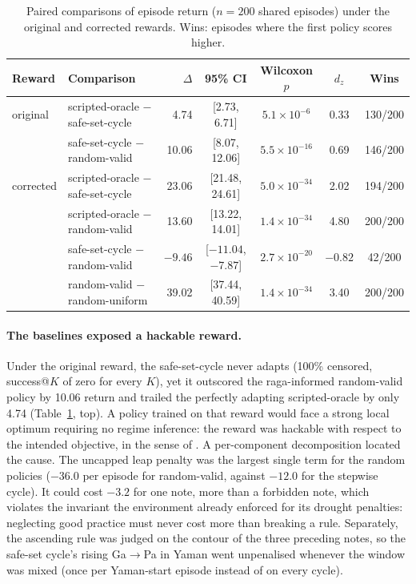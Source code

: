 \documentclass[11pt]{article}
\begin{document}
\begin{table}[t]
\centering\small
\caption{Paired comparisons of episode return ($n=200$ shared episodes) under the original and corrected rewards. Wins: episodes where the first policy scores higher.}
\label{tab:paired}
\begin{tabular}{@{}llrcccc@{}}
\toprule
Reward & Comparison & $\Delta$ & 95\% CI & Wilcoxon $p$ & $d_z$ & Wins \\
\midrule
original  & scripted-oracle $-$ safe-set-cycle & 4.74  & [2.73, 6.71]   & $5.1\times10^{-6}$  & 0.33 & 130/200 \\
          & safe-set-cycle $-$ random-valid    & 10.06 & [8.07, 12.06]  & $5.5\times10^{-16}$ & 0.69 & 146/200 \\
\midrule
corrected & scripted-oracle $-$ safe-set-cycle & 23.06 & [21.48, 24.61] & $5.0\times10^{-34}$ & 2.02 & 194/200 \\
          & scripted-oracle $-$ random-valid   & 13.60 & [13.22, 14.01] & $1.4\times10^{-34}$ & 4.80 & 200/200 \\
          & safe-set-cycle $-$ random-valid    & $-9.46$ & [$-11.04$, $-7.87$] & $2.7\times10^{-20}$ & $-0.82$ & 42/200 \\
          & random-valid $-$ random-uniform    & 39.02 & [37.44, 40.59] & $1.4\times10^{-34}$ & 3.40 & 200/200 \\
\bottomrule
\end{tabular}
\end{table}

\paragraph{The baselines exposed a hackable reward.} Under the original reward, the safe-set-cycle never adapts (100\% censored, success@$K$ of zero for every $K$), yet it outscored the raga-informed random-valid policy by 10.06 return and trailed the perfectly adapting scripted-oracle by only 4.74 (Table~\ref{tab:paired}, top). A policy trained on that reward would face a strong local optimum requiring no regime inference: the reward was hackable with respect to the intended objective, in the sense of \citet{skalse2022rewardhacking}. A per-component decomposition located the cause. The uncapped leap penalty was the largest single term for the random policies ($-36.0$ per episode for random-valid, against $-12.0$ for the stepwise cycle). It could cost $-3.2$ for one note, more than a forbidden note, which violates the invariant the environment already enforced for its drought penalties: neglecting good practice must never cost more than breaking a rule. Separately, the ascending rule was judged on the contour of the three preceding notes, so the safe-set cycle's rising Ga$\to$Pa in Yaman went unpenalised whenever the window was mixed (once per Yaman-start episode instead of on every cycle).
\end{document}
